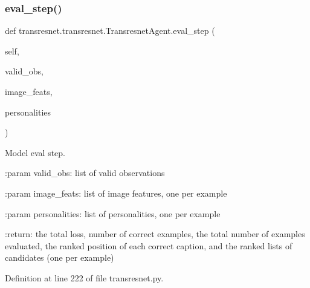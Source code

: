 \mbox{\label{classtransresnet_1_1transresnet_1_1TransresnetAgent_aa5c56c53ab470893e92e0c35a5a802c7}} 
\subsubsection{\texorpdfstring{eval\+\_\+step()}{eval\_step()}}
{\footnotesize\ttfamily def transresnet.\+transresnet.\+Transresnet\+Agent.\+eval\+\_\+step (\begin{DoxyParamCaption}\item[{}]{self,  }\item[{}]{valid\+\_\+obs,  }\item[{}]{image\+\_\+feats,  }\item[{}]{personalities }\end{DoxyParamCaption})}

\begin{DoxyVerb}Model eval step.

:param valid_obs:
    list of valid observations

:param image_feats:
    list of image features, one per example

:param personalities:
    list of personalities, one per example

:return:
    the total loss, number of correct examples, the total number of
    examples evaluated, the ranked position of each correct caption,
    and the ranked lists of candidates (one per example)
\end{DoxyVerb}
 

Definition at line 222 of file transresnet.\+py.



